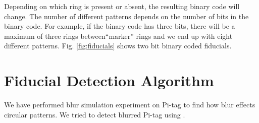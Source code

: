 \documentclass[runningheads]{llncs}
\begin{document}
Depending on which ring is present or absent, the resulting binary code will
change. The number of different patterns depends on the number of bits in the
binary code. For example, if the binary code has three bits, there will be a
maximum of three rings between``marker'' rings and we end up with eight
different patterns. Fig. \ref{fig:fiducials} shows two bit binary coded
fiducials.

\section{Fiducial Detection Algorithm}

We have performed blur simulation experiment on Pi-tag \cite{Pitag13} to find
how blur effects circular patterns. We tried to detect blurred Pi-tag using
\cite{ros_pitag}.
\end{document}
